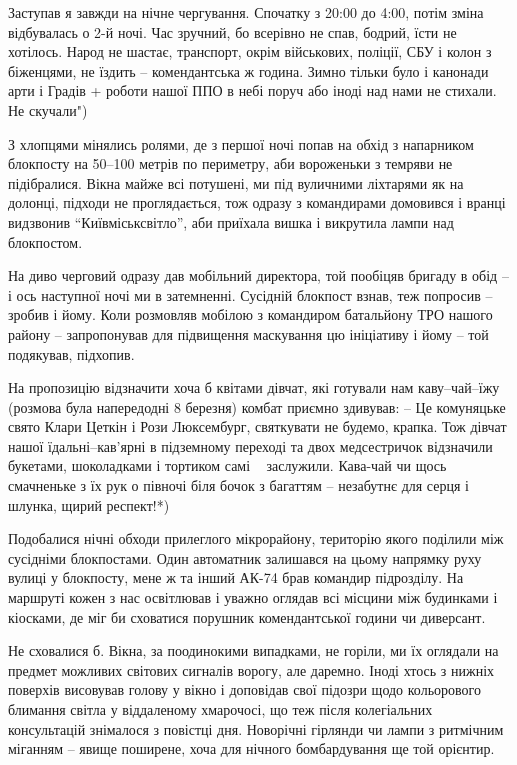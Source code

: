 Заступав я завжди на нічне чергування. Спочатку з 20:00 до 4:00, потім зміна
відбувалась о 2-й ночі. Час зручний, бо всерівно не спав, бодрий, їсти не
хотілось. Народ не шастає, транспорт, окрім військових, поліції, СБУ і колон з
біженцями, не їздить – комендантська ж година. Зимно тільки було і канонади
арти і Градів + роботи нашої ППО в небі поруч або іноді над нами не стихали. Не
скучали")


З хлопцями мінялись ролями, де з першої ночі попав на обхід з напарником
блокпосту на 50–100 метрів по периметру, аби вороженьки з темряви не
підібралися. Вікна майже всі потушені, ми під вуличними ліхтарями як на
долонці, підходи не проглядається, тож одразу з командирами домовився і вранці
видзвонив \enquote{Київміськсвітло}, аби приїхала вишка і викрутила лампи над
блокпостом. 

На диво черговий одразу дав мобільний директора, той пообіцяв бригаду в обід –
і ось наступної ночі ми в затемненні. Сусідній блокпост взнав, теж попросив –
зробив і йому. Коли розмовляв мобілою з командиром батальйону ТРО нашого району
– запропонував для підвищення маскування цю ініціативу і йому – той подякував,
підхопив. 

На пропозицію відзначити хоча б квітами дівчат, які готували нам каву–чай–їжу
(розмова була напередодні 8 березня) комбат приємно здивував: – Це комуняцьке
свято Клари Цеткін і Рози Люксембург, святкувати не будемо, крапка. Тож дівчат
нашої їдальні–кав'ярні в підземному переході та двох медсестричок відзначили
букетами, шоколадками і тортиком самі ~ заслужили. Кава-чай чи щось смачненьке
з їх рук о півночі біля бочок з багаттям – незабутнє для серця і шлунка, щирий
респект!*)

Подобалися нічні обходи прилеглого мікрорайону, територію якого поділили між
сусідніми блокпостами. Один автоматник залишався на цьому напрямку руху вулиці
у блокпосту, мене ж та інший АК-74 брав командир підрозділу. На маршруті кожен
з нас освітлював і уважно оглядав всі місцини між будинками і кіосками, де міг
би сховатися порушник комендантської години чи диверсант. 

Не сховалися б. Вікна, за поодинокими випадками, не горіли, ми їх оглядали на
предмет можливих світових сигналів ворогу, але даремно. Іноді хтось з нижніх
поверхів висовував голову у вікно і доповідав свої підозри щодо кольорового
блимання світла у віддаленому хмарочосі, що теж після колегіальних консультацій
знімалося з повістці дня. Новорічні гірлянди чи лампи з ритмічним міганням –
явище поширене, хоча для нічного бомбардування ще той орієнтир.

